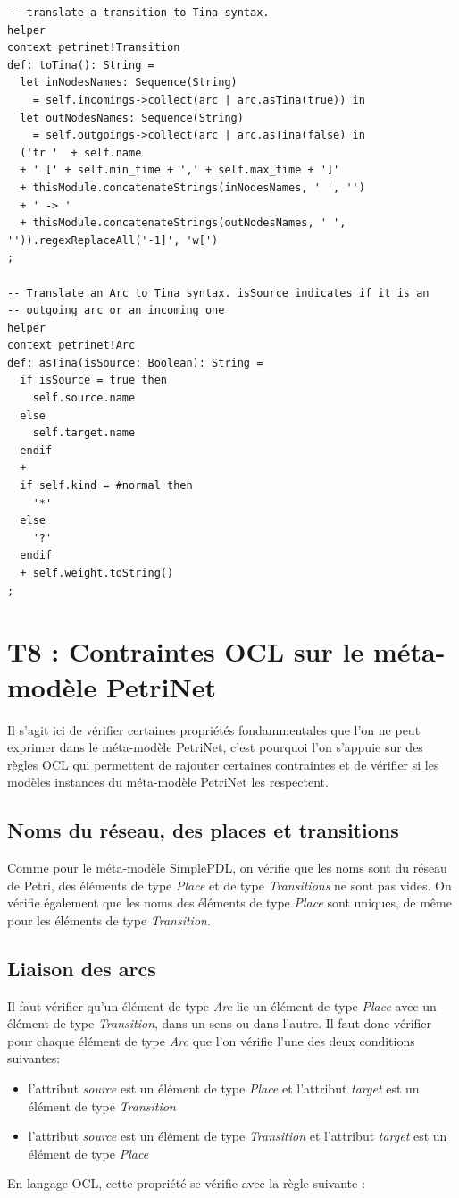 \documentclass{report}
\begin{document}
\begin{verbatim}
-- translate a transition to Tina syntax.
helper
context petrinet!Transition
def: toTina(): String =
  let inNodesNames: Sequence(String)
    = self.incomings->collect(arc | arc.asTina(true)) in
  let outNodesNames: Sequence(String)
    = self.outgoings->collect(arc | arc.asTina(false) in
  ('tr '  + self.name
  + ' [' + self.min_time + ',' + self.max_time + ']'
  + thisModule.concatenateStrings(inNodesNames, ' ', '')
  + ' -> '
  + thisModule.concatenateStrings(outNodesNames, ' ', '')).regexReplaceAll('-1]', 'w[')
;
		
-- Translate an Arc to Tina syntax. isSource indicates if it is an
-- outgoing arc or an incoming one
helper
context petrinet!Arc
def: asTina(isSource: Boolean): String =
  if isSource = true then
    self.source.name
  else
    self.target.name
  endif
  +
  if self.kind = #normal then
    '*'
  else
    '?'
  endif
  + self.weight.toString()
;
\end{verbatim}

\section{T8 : Contraintes OCL sur le méta-modèle PetriNet}
Il s'agit ici de vérifier certaines propriétés fondammentales que l'on ne peut exprimer dans le méta-modèle PetriNet, c'est pourquoi l'on s'appuie sur des règles OCL qui permettent de rajouter certaines contraintes et de vérifier si les modèles instances du méta-modèle PetriNet les respectent.\\

\subsection{Noms du réseau, des places et transitions}
Comme pour le méta-modèle SimplePDL, on vérifie que les noms sont du réseau de Petri, des éléments de type \textit{Place} et de type \textit{Transitions} ne sont pas vides. On vérifie également que les noms des éléments de type \textit{Place} sont uniques, de même pour les éléments de type \textit{Transition}.

\subsection{Liaison des arcs}
Il faut vérifier qu'un élément de type \textit{Arc} lie un élément de type \textit{Place} avec un élément de type \textit{Transition}, dans un sens ou dans l'autre. Il faut donc vérifier pour chaque élément de type \textit{Arc} que l'on vérifie l'une des deux conditions suivantes:
\begin{itemize}
\item l'attribut \textit{source} est un élément de type \textit{Place} et l'attribut \textit{target} est un élément de type \textit{Transition}
\item l'attribut \textit{source} est un élément de type \textit{Transition} et l'attribut \textit{target} est un élément de type \textit{Place}
\end{itemize}
En langage OCL, cette propriété se vérifie avec la règle suivante :
\end{document}
